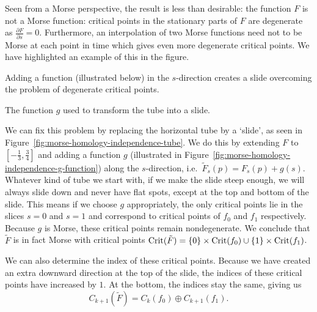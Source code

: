 \begin{myproof}
Seen from a Morse perspective, the result is less than desirable: the function $F$ is not a Morse function: critical points in the stationary parts of $F$ are degenerate as $\frac{\partial F}{\partial s} = 0$.
Furthermore, an interpolation of two Morse functions need not to be Morse at each point in time which gives even more degenerate critical points. We have highlighted an example of this in the figure.

\begin{marginfigure}
    \centering
    \caption{Adding a function (illustrated below) in the $s$-direction creates a slide overcoming the problem of degenerate critical points.}
    \label{fig:morse-homology-independence-tube}
\end{marginfigure}

\begin{marginfigure}
    \centering
    \caption{The function $g$ used to transform the tube into a slide.}
    \label{fig:morse-homology-independence-g-function}
\end{marginfigure}

We can fix this problem by replacing the horizontal tube by a `slide', as seen in Figure~\ref{fig:morse-homology-independence-tube}.
We do this by extending $F$ to $\left[-\frac{1}{3}, \frac{3}{4}\right]$ and adding a function $g$ (illustrated in Figure~\ref{fig:morse-homology-independence-g-function}) along the $s$-direction, i.e.\ $\tilde{F}_s(p) = F_s(p) + g(s)$.
Whatever kind of tube we start with, if we make the slide steep enough, we will always slide down and never have flat spots, except at the top and bottom of the slide.
This means if we choose $g$ appropriately, the only critical points lie in the slices $s=0$ and  $s=1$ and correspond to critical points of $f_0$ and $f_1$ respectively.
Because $g$ is Morse, these critical points remain nondegenerate.
We conclude that $\tilde{F}$ is in fact Morse with critical points $\operatorname{Crit}(\tilde{F}) = \{0\} \times \operatorname{Crit}(f_0) \cup \{1\} \times \operatorname{Crit}(f_1)$.

We can also determine the index of these critical points.
Because we have created an extra downward direction at the top of the slide, the indices of these critical points have increased by $1$.
At the bottom, the indices stay the same, giving us
\[
    C_{k+1}(\tilde{F}) = C_k(f_0) \oplus C_{k+1}(f_1)
.\] 


\end{myproof}
